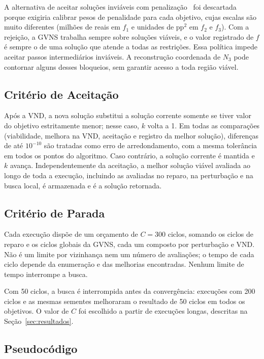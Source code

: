 \documentclass[conference]{IEEEtran}
\newcommand{\Cparada}{300}
\begin{document}
A alternativa de aceitar soluções inviáveis com penalização~\cite{aula04} foi descartada porque exigiria calibrar pesos de penalidade para cada objetivo, cujas escalas são muito diferentes (milhões de reais em $f_1$ e unidades de pp$^2$ em $f_2$ e $f_3$). Com a rejeição, a GVNS trabalha sempre sobre soluções viáveis, e o valor registrado de $f$ é sempre o de uma solução que atende a todas as restrições. Essa política impede aceitar passos intermediários inviáveis. A reconstrução coordenada de $N_3$ pode contornar alguns desses bloqueios, sem garantir acesso a toda região viável.

\subsection{Critério de Aceitação}

Após a VND, a nova solução substitui a solução corrente somente se tiver valor do objetivo estritamente menor; nesse caso, $k$ volta a 1. Em todas as comparações (viabilidade, melhora na VND, aceitação e registro da melhor solução), diferenças de até $10^{-10}$ são tratadas como erro de arredondamento, com a mesma tolerância em todos os pontos do algoritmo. Caso contrário, a solução corrente é mantida e $k$ avança. Independentemente da aceitação, a melhor solução viável avaliada ao longo de toda a execução, incluindo as avaliadas no reparo, na perturbação e na busca local, é armazenada e é a solução retornada.

\subsection{Critério de Parada}

Cada execução dispõe de um orçamento de $C=\Cparada$ ciclos, somando os ciclos de reparo e os ciclos globais da GVNS, cada um composto por perturbação e VND. Não é um limite por vizinhança nem um número de avaliações; o tempo de cada ciclo depende da enumeração e das melhorias encontradas. Nenhum limite de tempo interrompe a busca.

Com 50 ciclos, a busca é interrompida antes da convergência: execuções com 200 ciclos e as mesmas sementes melhoraram o resultado de 50 ciclos em todos os objetivos. O valor de $C$ foi escolhido a partir de execuções longas, descritas na Seção~\ref{sec:resultados}.

\subsection{Pseudocódigo}
\end{document}
